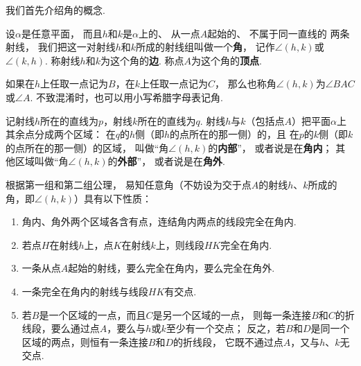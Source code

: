 我们首先介绍角的概念.
\begin{definition}\label{definition:欧式几何.几何元素.角}
设\(\alpha\)是任意平面，%
而且\(h\)和\(k\)是\(\alpha\)上的、%
从一点\(A\)起始的、%
不属于同一直线的%
两条射线，%
我们把这一对射线\(h\)和\(k\)所成的射线组叫做一个\textbf{角}，%
记作\(\angle(h,k)\)或\(\angle(k,h)\).
称射线\(h\)和\(k\)为这个角的\textbf{边}.
称点\(A\)为这个角的\textbf{顶点}.

如果在\(h\)上任取一点记为\(B\)，在\(k\)上任取一点记为\(C\)，%
那么也称角\(\angle(h,k)\)为\(\angle BAC\)或\(\angle A\).
不致混淆时，也可以用小写希腊字母表记角.

记射线\(h\)所在的直线为\(p\)，射线\(k\)所在的直线为\(q\).
射线\(h\)与\(k\)（包括点\(A\)）把平面\(\alpha\)上其余点分成两个区域：
在\(q\)的\(h\)侧（即\(h\)的点所在的那一侧）的，且%
在\(p\)的\(k\)侧（即\(k\)的点所在的那一侧）的区域，%
叫做“角\(\angle(h,k)\)的\textbf{内部}”，%
或者说是在\textbf{角内}；
其他区域叫做“角\(\angle(h,k)\)的\textbf{外部}”，%
或者说是在\textbf{角外}.
\end{definition}

\begin{property}
根据第一组和第二组公理，%
易知任意角（不妨设为交于点\(A\)的射线\(h\)、\(k\)所成的角，即\(\angle(h,k)\)）具有以下性质：
\begin{enumerate}
\item 角内、角外两个区域各含有点，连结角内两点的线段完全在角内.
\item 若点\(H\)在射线\(h\)上，点\(K\)在射线\(k\)上，则线段\(HK\)完全在角内.
\item 一条从点\(A\)起始的射线，要么完全在角内，要么完全在角外.
\item 一条完全在角内的射线与线段\(HK\)有交点.
\item 若\(B\)是一个区域的一点，而且\(C\)是另一个区域的一点，%
则每一条连接\(B\)和\(C\)的折线段，要么通过点\(A\)，要么与\(h\)或\(k\)至少有一个交点；
反之，若\(B\)和\(D\)是同一个区域的两点，则恒有一条连接\(B\)和\(D\)的折线段，%
它既不通过点\(A\)，又与\(h\)、\(k\)无交点.
\end{enumerate}
\end{property}


